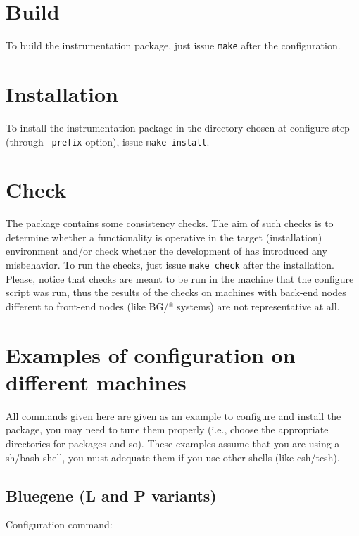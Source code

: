\section{Build}

To build the instrumentation package, just issue {\tt make} after the configuration.

\section{Installation}

To install the instrumentation package in the directory chosen at configure step (through {\tt --prefix} option), issue {\tt make install}.

\section{Check}

The \TRACE package contains some consistency checks. The aim of such checks is to determine whether a functionality is operative in the target (installation) environment and/or check whether the development of \TRACE has introduced any misbehavior. To run the checks, just issue {\tt make check} after the installation. Please, notice that checks are meant to be run in the machine that the configure script was run, thus the results of the checks on machines with back-end nodes different to front-end nodes (like BG/* systems) are not representative at all.

\section{Examples of configuration on different machines}

All commands given here are given as an example to configure and install the package, you may need to tune them properly (i.e., choose the appropriate directories for packages and so).  These examples assume that you are using a sh/bash shell, you must adequate them if you use other shells (like csh/tcsh).

\subsection{Bluegene (L and P variants)}

Configuration command:


